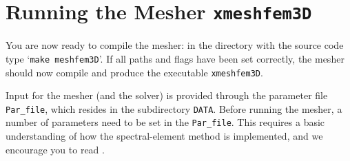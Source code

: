 \documentclass[onecolumn]{article}
\begin{document}
\section{Running the Mesher \texttt{xmeshfem3D}}
\label{section:mesher}

You are now ready to compile the mesher: in the
directory with the source code type `\texttt{make meshfem3D}'.
If all paths and flags have been set correctly, the mesher should now
compile and produce the executable \texttt{xmeshfem3D}.

Input for the mesher (and the solver)
is provided through the parameter file \texttt{Par\_file},
which resides in the subdirectory \texttt{DATA}.
Before running the mesher, a number of parameters need to be
set in the \texttt{Par\_file}. This requires a basic understanding
of how the spectral-element method is implemented,
and we encourage you to read \cite{KoRiTr02,KoTr02a,KoTr02b}.
\end{document}
